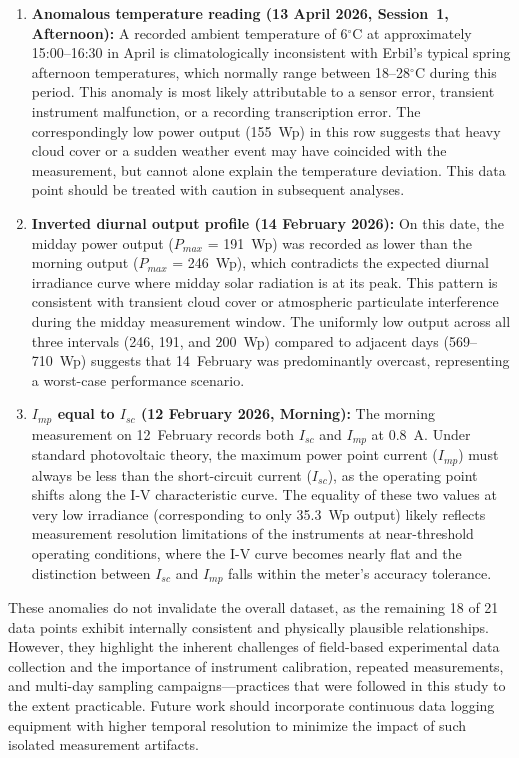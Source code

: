 \begin{enumerate}
    \item \textbf{Anomalous temperature reading (13 April 2026, Session~1, Afternoon):} A recorded ambient temperature of 6$^{\circ}$C at approximately 15:00--16:30 in April is climatologically inconsistent with Erbil's typical spring afternoon temperatures, which normally range between 18--28$^{\circ}$C during this period. This anomaly is most likely attributable to a sensor error, transient instrument malfunction, or a recording transcription error. The correspondingly low power output (155~Wp) in this row suggests that heavy cloud cover or a sudden weather event may have coincided with the measurement, but cannot alone explain the temperature deviation. This data point should be treated with caution in subsequent analyses.

    \item \textbf{Inverted diurnal output profile (14 February 2026):} On this date, the midday power output ($P_{max}$ = 191~Wp) was recorded as lower than the morning output ($P_{max}$ = 246~Wp), which contradicts the expected diurnal irradiance curve where midday solar radiation is at its peak. This pattern is consistent with transient cloud cover or atmospheric particulate interference during the midday measurement window. The uniformly low output across all three intervals (246, 191, and 200~Wp) compared to adjacent days (569--710~Wp) suggests that 14~February was predominantly overcast, representing a worst-case performance scenario.

    \item \textbf{$I_{mp}$ equal to $I_{sc}$ (12 February 2026, Morning):} The morning measurement on 12~February records both $I_{sc}$ and $I_{mp}$ at 0.8~A. Under standard photovoltaic theory, the maximum power point current ($I_{mp}$) must always be less than the short-circuit current ($I_{sc}$), as the operating point shifts along the I-V characteristic curve. The equality of these two values at very low irradiance (corresponding to only 35.3~Wp output) likely reflects measurement resolution limitations of the instruments at near-threshold operating conditions, where the I-V curve becomes nearly flat and the distinction between $I_{sc}$ and $I_{mp}$ falls within the meter's accuracy tolerance.
\end{enumerate}

These anomalies do not invalidate the overall dataset, as the remaining 18 of 21 data points exhibit internally consistent and physically plausible relationships. However, they highlight the inherent challenges of field-based experimental data collection and the importance of instrument calibration, repeated measurements, and multi-day sampling campaigns---practices that were followed in this study to the extent practicable. Future work should incorporate continuous data logging equipment with higher temporal resolution to minimize the impact of such isolated measurement artifacts.


